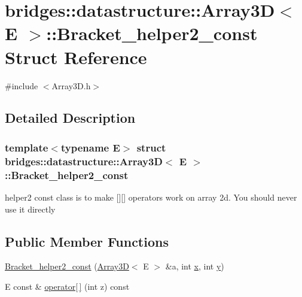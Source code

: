 \hypertarget{structbridges_1_1datastructure_1_1_array3_d_1_1_bracket__helper2__const}{}\section{bridges\+:\+:datastructure\+:\+:Array3D$<$ E $>$\+:\+:Bracket\+\_\+helper2\+\_\+const Struct Reference}
\label{structbridges_1_1datastructure_1_1_array3_d_1_1_bracket__helper2__const}


{\ttfamily \#include $<$Array3\+D.\+h$>$}



\subsection{Detailed Description}
\subsubsection*{template$<$typename E$>$\newline
struct bridges\+::datastructure\+::\+Array3\+D$<$ E $>$\+::\+Bracket\+\_\+helper2\+\_\+const}

helper2 const class is to make \mbox{[}\mbox{]}\mbox{[}\mbox{]} operators work on array 2d. You should never use it directly \subsection*{Public Member Functions}
\begin{DoxyCompactItemize}
\item 
\hyperlink{structbridges_1_1datastructure_1_1_array3_d_1_1_bracket__helper2__const_a30128c8c2025bb03325b2c91020dabc5}{Bracket\+\_\+helper2\+\_\+const} (\hyperlink{classbridges_1_1datastructure_1_1_array3_d}{Array3D}$<$ E $>$ \&a, int \hyperlink{structbridges_1_1datastructure_1_1_array3_d_1_1_bracket__helper2__const_af71fd602aef4eac98d6ffe3f13f42dd8}{x}, int \hyperlink{structbridges_1_1datastructure_1_1_array3_d_1_1_bracket__helper2__const_a5c76d396209c5060f72c321d2b70e707}{y})
\item 
E const  \& \hyperlink{structbridges_1_1datastructure_1_1_array3_d_1_1_bracket__helper2__const_a55b6db54acf32062d3dbba7ce72e643f}{operator\mbox{[}$\,$\mbox{]}} (int z) const
\end{DoxyCompactItemize}
